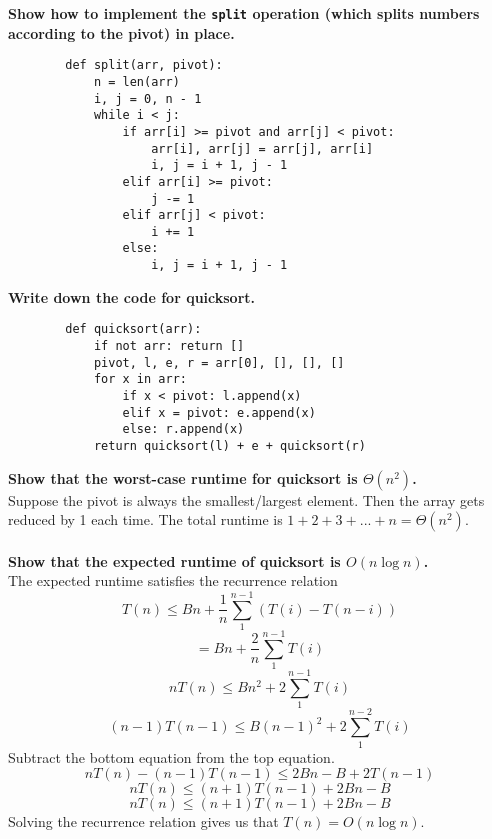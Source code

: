 \begin{problem}{2.15}
\textbf{Show how to implement the \texttt{split} operation (which splits numbers according to the pivot) in place.}
    \begin{lstlisting}
        def split(arr, pivot):
            n = len(arr)
            i, j = 0, n - 1
            while i < j:
                if arr[i] >= pivot and arr[j] < pivot:
                    arr[i], arr[j] = arr[j], arr[i]
                    i, j = i + 1, j - 1
                elif arr[i] >= pivot:
                    j -= 1
                elif arr[j] < pivot:
                    i += 1
                else:
                    i, j = i + 1, j - 1
    \end{lstlisting}
\end{problem}

\begin{problem}{2.24}
    \textbf{Write down the code for quicksort.}
     \begin{lstlisting}
        def quicksort(arr):
            if not arr: return []
            pivot, l, e, r = arr[0], [], [], []
            for x in arr:
                if x < pivot: l.append(x)
                elif x = pivot: e.append(x)
                else: r.append(x)
            return quicksort(l) + e + quicksort(r)
    \end{lstlisting}
    \textbf{Show that the worst-case runtime for quicksort is $\Theta(n^2)$.}
    \\
    Suppose the pivot is always the smallest/largest element. Then the array gets reduced by 1 each time. The total runtime is $1 + 2 + 3 + ... + n = \Theta(n^2)$.
    \\ \\
    \textbf{Show that the expected runtime of quicksort is $O(n \log n)$.}
    \\
    The expected runtime satisfies the recurrence relation
    \[
        T(n) \leq Bn + \frac{1}{n}\sum_{1}^{n - 1} (T(i) - T(n - i))
    \]
    \[
        = Bn + \frac{2}{n}\sum_{1}^{n - 1} T(i)
    \]
    \[
        nT(n) \leq Bn^2 + 2\sum_{1}^{n - 1} T(i)
    \]
    \[
        (n - 1)T(n - 1) \leq B(n - 1)^2 + 2\sum_{1}^{n - 2} T(i)
    \]
    Subtract the bottom equation from the top equation.
    \[
        nT(n) - (n - 1)T(n - 1) \leq 2Bn - B + 2T(n - 1)
    \]
    \[
        nT(n) \leq (n + 1)T(n - 1) + 2Bn - B
    \]
    \[
        nT(n) \leq (n + 1)T(n - 1) + 2Bn - B
    \]
    Solving the recurrence relation gives us that $T(n) = O(n \log n)$.
\end{problem}

